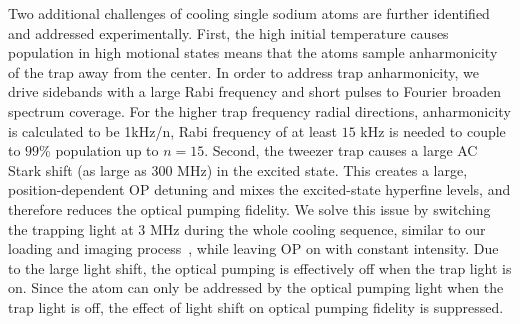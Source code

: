 \documentclass[aps,prl,twocolumn,groupedaddress]{revtex4-1}
\begin{document}
Two additional challenges of cooling single sodium atoms are
further identified and addressed experimentally.
First, the high initial temperature causes population in high motional states
means that the atoms sample anharmonicity of the trap away from the center.
In order to address trap anharmonicity, we drive sidebands with a large Rabi frequency
and short pulses to Fourier broaden spectrum coverage.
For the higher trap frequency radial directions, anharmonicity is calculated to be 1kHz/n,
Rabi frequency of at least $15$ kHz is needed to couple to $99$\% population up to $n=15$.
Second, the  tweezer trap  causes a large AC Stark shift (as large as $300$ MHz)
in the excited state. This creates  a large, position-dependent OP detuning
and mixes the excited-state hyperfine levels, and therefore reduces the optical pumping fidelity.
We solve this issue by switching the trapping light at 3 MHz during the whole cooling sequence,
similar to our loading and imaging process~\cite{Hutzler2017-LightShifts},
while leaving OP on with constant intensity.
Due to the large light shift, the optical pumping is effectively off when the trap light is on.
Since the atom can only be addressed by the optical pumping light when the trap light is off,
the effect of light shift on optical pumping fidelity is suppressed.
\end{document}
